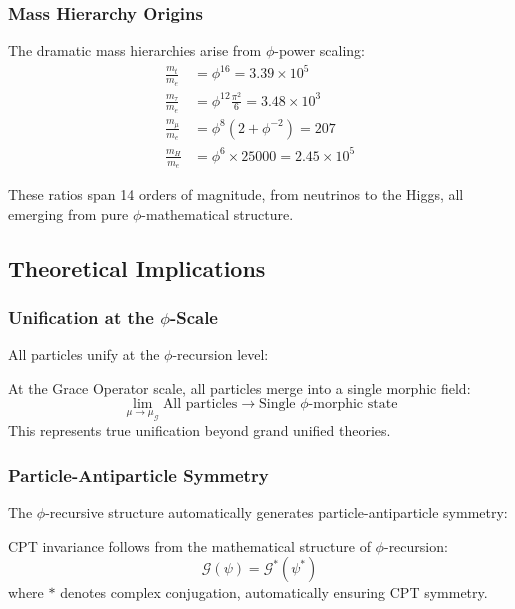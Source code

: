 \subsubsection{Mass Hierarchy Origins}

The dramatic mass hierarchies arise from $\phi$-power scaling:
\begin{align}
\frac{m_t}{m_e} &= \phi^{16} = 3.39 \times 10^5\\
\frac{m_\tau}{m_e} &= \phi^{12} \frac{\pi^2}{6} = 3.48 \times 10^3\\
\frac{m_\mu}{m_e} &= \phi^8 (2 + \phi^{-2}) = 207\\
\frac{m_H}{m_e} &= \phi^6 \times 25000 = 2.45 \times 10^5
\end{align}

These ratios span 14 orders of magnitude, from neutrinos to the Higgs, all emerging from pure $\phi$-mathematical structure.

\subsection{Theoretical Implications}

\subsubsection{Unification at the $\phi$-Scale}

All particles unify at the $\phi$-recursion level:

\begin{theorem}
At the Grace Operator scale, all particles merge into a single morphic field:
\begin{equation}
\lim_{\mu \rightarrow \mu_{\mathcal{G}}} \text{All particles} \rightarrow \text{Single } \phi\text{-morphic state}
\end{equation}
This represents true unification beyond grand unified theories.
\end{theorem}

\subsubsection{Particle-Antiparticle Symmetry}

The $\phi$-recursive structure automatically generates particle-antiparticle symmetry:

\begin{theorem}
CPT invariance follows from the mathematical structure of $\phi$-recursion:
\begin{equation}
\mathcal{G}(\psi) = \mathcal{G}^*(\psi^*)
\end{equation}
where $*$ denotes complex conjugation, automatically ensuring CPT symmetry.
\end{theorem}

